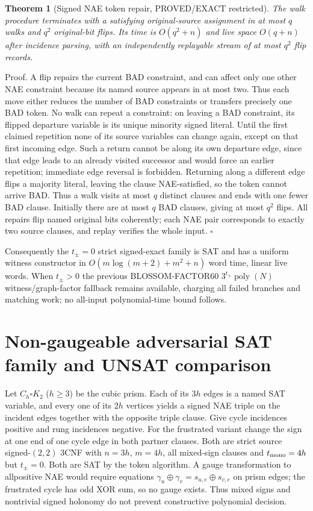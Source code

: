 \documentclass[11pt]{article}
\newtheorem{theorem}{Theorem}
\begin{document}
\begin{theorem}[Signed NAE token repair, PROVED/EXACT restricted]
The walk procedure terminates with a satisfying original-source assignment in at most $q$ walks and $q^2$ original-bit flips. Its time is $O(q^2+n)$ and live space $O(q+n)$ after incidence parsing, with an independently replayable stream of at most $q^2$ flip records.
\end{theorem}
\noindent Proof. A flip repairs the current BAD constraint, and can affect only one other NAE constraint because its named source appears in at most two. Thus each move either reduces the number of BAD constraints or transfers precisely one BAD token. No walk can repeat a constraint: on leaving a BAD constraint, its flipped departure variable is its unique minority signed literal. Until the first claimed repetition none of its source variables can change again, except on that first incoming edge. Such a return cannot be along its own departure edge, since that edge leads to an already visited successor and would force an earlier repetition; immediate edge reversal is forbidden. Returning along a different edge flips a majority literal, leaving the clause NAE-satisfied, so the token cannot arrive BAD. Thus a walk visits at most $q$ distinct clauses and ends with one fewer BAD clause. Initially there are at most $q$ BAD clauses, giving at most $q^2$ flips. All repairs flip named original bits coherently; each NAE pair corresponds to exactly two source clauses, and replay verifies the whole input. \hfill$\square$

Consequently the $t_{\pm}=0$ strict signed-exact family is SAT and has a uniform witness constructor in $O(m\log(m+2)+m^2+n)$ word time, linear live words. When $t_{\pm}>0$ the previous BLOSSOM-FACTOR60 $3^{t_{\pm}}\operatorname{poly}(N)$ witness/graph-factor fallback remains available, charging all failed branches and matching work; no all-input polynomial-time bound follows.

\section{Non-gaugeable adversarial SAT family and UNSAT comparison}
Let $C_h\square K_2$ ($h\ge3$) be the cubic prism. Each of its $3h$ edges is a named SAT variable, and every one of its $2h$ vertices yields a signed NAE triple on the incident edges together with the opposite triple clause. Give cycle incidences positive and rung incidences negative. For the frustrated variant change the sign at one end of one cycle edge in both partner clauses. Both are strict source signed-$(2,2)$ 3CNF with $n=3h$, $m=4h$, all mixed-sign clauses and $t_{\rm mono}=4h$ but $t_\pm=0$. Both are SAT by the token algorithm. A gauge transformation to allpositive NAE would require equations $\gamma_u\oplus\gamma_v=s_{u,e}\oplus s_{v,e}$ on prism edges; the frustrated cycle has odd XOR sum, so no gauge exists. Thus mixed signs and nontrivial signed holonomy do not prevent constructive polynomial decision.
\end{document}
